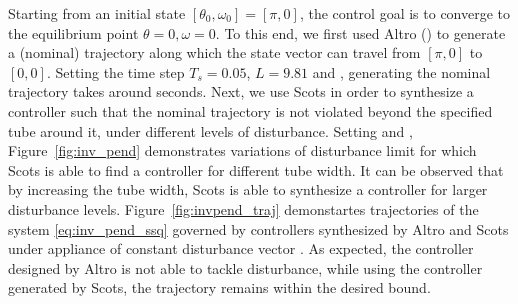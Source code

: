 Starting from an initial state $[\theta_0,\omega_0]=[\pi,0]$, the control goal is to converge to the equilibrium point 
$\theta=0, \omega=0$. To this end, we first used Altro () to generate a (nominal) trajectory along which the state vector can travel from $[\pi,0]$ to $[0,0]$. Setting the time step $T_s=0.05$, $L=9.81$ and , generating the nominal trajectory takes around  seconds. Next, we use Scots in order to synthesize a controller such that the nominal trajectory is not violated beyond the specified tube around it, under different levels of disturbance. Setting  and , Figure~\ref{fig:inv_pend} demonstrates variations of disturbance limit for which Scots is able to find a controller for different tube width. It can be observed that by increasing the tube width, Scots is able to synthesize a controller for larger disturbance levels. Figure~\ref{fig:invpend_traj} demonstartes trajectories of the system  \eqref{eq:inv_pend_ssq} governed by controllers synthesized by Altro and Scots under appliance of constant disturbance vector \MS{$[??,??]$}. As expected, the controller designed by Altro is not able to tackle disturbance, while using the controller generated by Scots, the trajectory remains within the desired bound.
